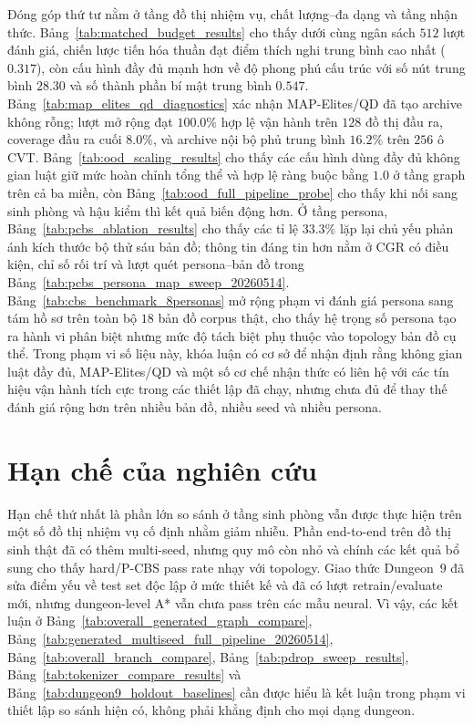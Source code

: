 \documentclass[oneside,a4paper,12pt]{extreport}
\begin{document}
Đóng góp thứ tư nằm ở tầng đồ thị nhiệm vụ, chất lượng--đa dạng và tầng nhận thức. Bảng~\ref{tab:matched_budget_results} cho thấy dưới cùng ngân sách $512$ lượt đánh giá, chiến lược tiến hóa thuần đạt điểm thích nghi trung bình cao nhất (\textbf{$0.317$}), còn cấu hình đầy đủ mạnh hơn về độ phong phú cấu trúc với số nút trung bình \textbf{$28.30$} và số thành phần bí mật trung bình \textbf{$0.547$}. Bảng~\ref{tab:map_elites_qd_diagnostics} xác nhận MAP-Elites/QD đã tạo archive không rỗng; lượt mở rộng đạt \textbf{$100.0\%$} hợp lệ vận hành trên $128$ đồ thị đầu ra, coverage đầu ra cuối \textbf{$8.0\%$}, và archive nội bộ phủ trung bình $16.2\%$ trên $256$ ô CVT. Bảng~\ref{tab:ood_scaling_results} cho thấy các cấu hình dùng đầy đủ không gian luật giữ mức hoàn chỉnh tổng thể và hợp lệ ràng buộc bằng $1.0$ ở tầng graph trên cả ba miền, còn Bảng~\ref{tab:ood_full_pipeline_probe} cho thấy khi nối sang sinh phòng và hậu kiểm thì kết quả biến động hơn. Ở tầng persona, Bảng~\ref{tab:pcbs_ablation_results} cho thấy các tỉ lệ $33.3\%$ lặp lại chủ yếu phản ánh kích thước bộ thử sáu bản đồ; thông tin đáng tin hơn nằm ở CGR có điều kiện, chỉ số rối trí và lượt quét persona--bản đồ trong Bảng~\ref{tab:pcbs_persona_map_sweep_20260514}. Bảng~\ref{tab:cbs_benchmark_8personas} mở rộng phạm vi đánh giá persona sang tám hồ sơ trên toàn bộ $18$ bản đồ corpus thật, cho thấy hệ trọng số persona tạo ra hành vi phân biệt nhưng mức độ tách biệt phụ thuộc vào topology bản đồ cụ thể. Trong phạm vi số liệu này, khóa luận có cơ sở để nhận định rằng không gian luật đầy đủ, MAP-Elites/QD và một số cơ chế nhận thức có liên hệ với các tín hiệu vận hành tích cực trong các thiết lập đã chạy, nhưng chưa đủ để thay thế đánh giá rộng hơn trên nhiều bản đồ, nhiều seed và nhiều persona.

\section{Hạn chế của nghiên cứu}
Hạn chế thứ nhất là phần lớn so sánh ở tầng sinh phòng vẫn được thực hiện trên một số đồ thị nhiệm vụ cố định nhằm giảm nhiễu. Phần end-to-end trên đồ thị sinh thật đã có thêm multi-seed, nhưng quy mô còn nhỏ và chính các kết quả bổ sung cho thấy hard/P-CBS pass rate nhạy với topology. Giao thức Dungeon~$9$ đã sửa điểm yếu về test set độc lập ở mức thiết kế và đã có lượt retrain/evaluate mới, nhưng dungeon-level A* vẫn chưa pass trên các mẫu neural. Vì vậy, các kết luận ở Bảng~\ref{tab:overall_generated_graph_compare}, Bảng~\ref{tab:generated_multiseed_full_pipeline_20260514}, Bảng~\ref{tab:overall_branch_compare}, Bảng~\ref{tab:pdrop_sweep_results}, Bảng~\ref{tab:tokenizer_compare_results} và Bảng~\ref{tab:dungeon9_holdout_baselines} cần được hiểu là kết luận trong phạm vi thiết lập so sánh hiện có, không phải khẳng định cho mọi dạng dungeon.
\end{document}
